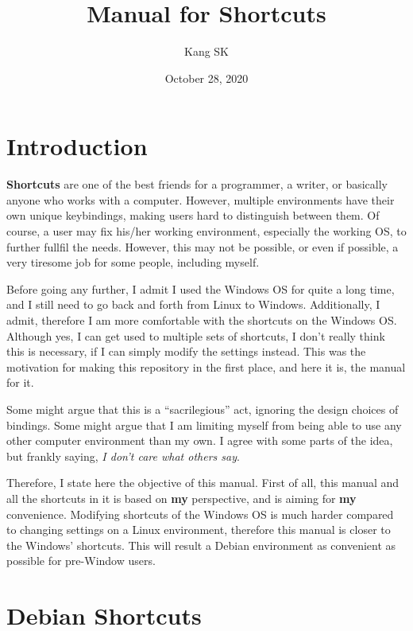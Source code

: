\documentclass[10pt]{article}
\title{Manual for Shortcuts}
\author{Kang SK}
\date{October 28, 2020}
\begin{document}
\setlength{\parskip}{\baselineskip}

\maketitle\label{title}
\tableofcontents\label{tableofcontents}
\newpage

\section*{Introduction} \label{S_Introduction}

\textbf{Shortcuts} are one of the best friends for a programmer, a writer, or basically anyone who works with a computer.
However, multiple environments have their own unique keybindings, making users hard to distinguish between them.
Of course, a user may fix his/her working environment, especially the working OS, to further fullfil the needs.
However, this may not be possible, or even if possible, a very tiresome job for some people, including myself.

Before going any further, I admit I used the Windows OS for quite a long time, and I still need to go back and forth from Linux to Windows.
Additionally, I admit, therefore I am more comfortable with the shortcuts on the Windows OS.
Although yes, I can get used to multiple sets of shortcuts, I don't really think this is necessary, if I can simply modify the settings instead.
This was the motivation for making this repository in the first place, and here it is, the manual for it.

Some might argue that this is a ``sacrilegious'' act, ignoring the design choices of bindings.
Some might argue that I am limiting myself from being able to use any other computer environment than my own.
I agree with some parts of the idea, but frankly saying, \emph{I don't care what others say}.

Therefore, I state here the objective of this manual.
First of all, this manual and all the shortcuts in it is based on \textbf{my} perspective, and is aiming for \textbf{my} convenience.
Modifying shortcuts of the Windows OS is much harder compared to changing settings on a Linux environment, therefore this manual is closer to the Windows' shortcuts.
This will result a Debian environment as convenient as possible for pre-Window users.

\newpage
{}

\section{Debian Shortcuts} \label{S_Debain}
\end{document}
